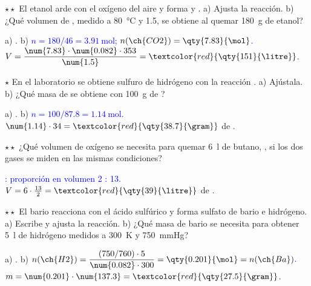 \begin{exercise}
    \(\star\star\) El etanol arde con el oxígeno del aire y forma  y . a) Ajusta la reacción. b) ¿Qué volumen de
    , medido a \qty{80}{\degreeCelsius} y \qty{1.5}{\atm}, se obtiene al quemar \qty{180}{\gram} de etanol?
    \begin{solu}
        a) \textcolor{red}{}. b) \textcolor{blue}{\(n = 180/46 = \qty{3.91}{\mol}\);
        \(n(\ch{CO2}) = \qty{7.83}{\mol}\).} \(V = \dfrac{\num{7.83} \cdot \num{0.082} \cdot 353}{\num{1.5}} = \textcolor{red}{\qty{151}{\litre}}\).
    \end{solu}
\end{exercise}

\begin{exercise}
    \(\star\) En el laboratorio se obtiene sulfuro de hidrógeno con la reacción .
    a) Ajústala. b) ¿Qué masa de  se obtiene con \qty{100}{\gram} de ?
    \begin{solu}
        a) \textcolor{red}{}. b) \textcolor{blue}{\(n = 100/\num{87.8} = \qty{1.14}{\mol}\).}
        \(\num{1.14} \cdot 34 = \textcolor{red}{\qty{38.7}{\gram}}\) de .
    \end{solu}
\end{exercise}

\begin{exercise}
    \(\star\star\) ¿Qué volumen de oxígeno se necesita para quemar \qty{6}{\litre} de butano, , si los dos gases se
    miden en las mismas condiciones?
    \begin{solu}
        \textcolor{blue}{: proporción en volumen 2 : 13.} \(V = 6 \cdot \frac{13}{2} =
        \textcolor{red}{\qty{39}{\litre}}\) de .
    \end{solu}
\end{exercise}

\begin{exercise}
    \(\star\star\) El bario reacciona con el ácido sulfúrico y forma sulfato de bario e hidrógeno. a) Escribe y ajusta la reacción.
    b) ¿Qué masa de bario se necesita para obtener \qty{5}{\litre} de hidrógeno medidos a \qty{300}{\kelvin} y \qty{750}{\mmHg}?
    \begin{solu}
        a) \textcolor{red}{}. b) \textcolor{blue}{\(n(\ch{H2}) = \dfrac{(750/760) \cdot 5}{\num{0.082} \cdot 300} =
        \qty{0.201}{\mol} = n(\ch{Ba})\).} \(m = \num{0.201} \cdot \num{137.3} = \textcolor{red}{\qty{27.5}{\gram}}\).
    \end{solu}
\end{exercise}

